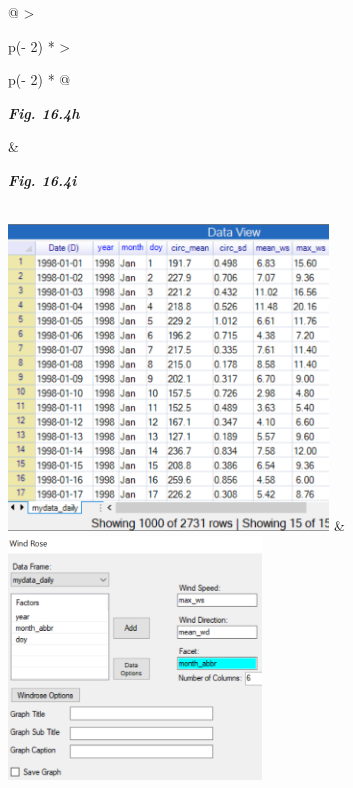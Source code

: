 \documentclass[
  letterpaper,
  DIV=11,
  numbers=noendperiod]{scrreprt}
\begin{document}
\begin{longtable}[]{@{}
  >{\raggedright\arraybackslash}p{(\columnwidth - 2\tabcolsep) * }
  >{\raggedright\arraybackslash}p{(\columnwidth - 2\tabcolsep) * }@{}}
\toprule\noalign{}
\begin{minipage}[b]{\linewidth}\raggedright
\textbf{\emph{Fig. 16.4h}}
\end{minipage} & \begin{minipage}[b]{\linewidth}\raggedright
\textbf{\emph{Fig. 16.4i}}
\end{minipage} \\
\midrule\noalign{}
\endhead
\bottomrule\noalign{}
\endlastfoot
\includegraphics[width=3.34714in,height=3.20161in]{figures/Fig16.4h.png}
&
\includegraphics[width=2.64976in,height=2.54322in]{figures/Fig16.4i.png} \\
\end{longtable}
\end{document}
